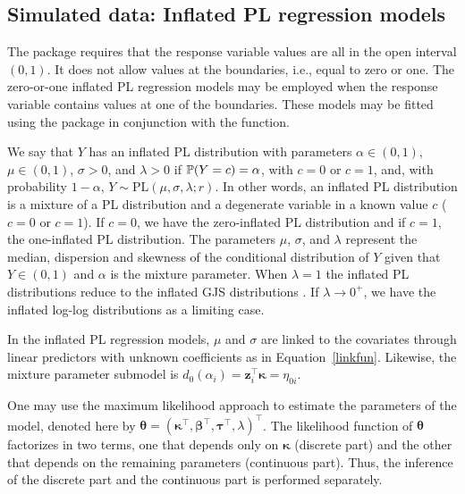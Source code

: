 \subsection{Simulated data: Inflated PL regression models}

The  package requires that the response variable values are all in the open interval $(0,1)$. It does not allow values at the boundaries, i.e., equal to zero or one. The zero-or-one inflated PL regression models may be employed when the response variable contains values at one of the boundaries. These models may be fitted using the  package in conjunction with the  function.

We say that $Y$ has an inflated PL distribution with parameters $\alpha \in (0,1)$, $\mu \in (0,1)$, $\sigma>0$, and $\lambda>0$ if $\mathbb{P}(Y=c) = \alpha$, with $c=0$ or $c=1$, and, with probability $1-\alpha$, $Y \sim \mbox{PL}(\mu, \sigma, \lambda; r)$. In other words, an inflated PL distribution is a mixture of a PL distribution and a degenerate variable in a known value $c$ ($c=0$ or $c=1$). If $c=0$, we have the zero-inflated PL distribution and if $c=1$, the one-inflated PL distribution. The parameters $\mu$, $\sigma$, and $\lambda$ represent the median, dispersion and skewness of the conditional distribution of $Y$ given that $Y \in (0,1)$ and $\alpha$ is the mixture parameter. When $\lambda=1$ the inflated PL distributions reduce to the inflated GJS distributions \citep{QueirozLemonte2021}. If $\lambda \to 0^+$, we have the inflated log-log distributions as a limiting case. 

In the inflated PL regression models, $\mu$ and $\sigma$ are linked to the covariates through linear predictors with unknown coefficients as in Equation~\ref{linkfun}. Likewise, the mixture parameter submodel is $d_0(\alpha_i) = \bm{z}_i^\top \bm{\kappa} = \eta_{0i}$.

One may use the maximum likelihood approach to estimate the parameters of the model, denoted here by $\bm{\theta} = (\bm{\kappa}^\top, \bm{\beta}^\top, \bm{\tau}^\top, \lambda)^\top$. The likelihood function of $\bm{\theta}$ factorizes in two terms, one that depends only on $\bm{\kappa}$ (discrete part) and the other that depends on the remaining parameters (continuous part). Thus, the inference of the discrete part and the continuous part is performed separately. 

